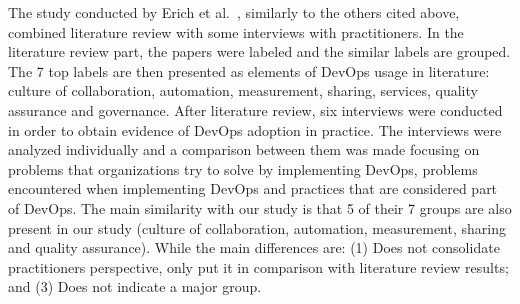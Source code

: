 The study conducted by Erich et al.~\cite{qualitative_devops_journalsw_17},
similarly to the others cited above, combined literature review with some
interviews with practitioners. In the literature review part, the papers were
labeled and the similar labels are grouped. The 7 top labels are then presented
as elements of DevOps usage in literature: culture of collaboration, automation,
measurement, sharing, services, quality assurance and governance. After literature
review, six interviews were conducted in order to obtain evidence of DevOps
adoption in practice. The interviews were analyzed individually and a comparison
between them was made focusing on problems that organizations try to solve by
implementing DevOps, problems encountered when implementing DevOps and practices
that are considered part of DevOps. The main similarity with our study
is that 5 of their 7 groups are also present in our study (culture of collaboration,
automation, measurement, sharing and quality assurance). While the main
differences are: (1) Does not consolidate practitioners perspective, only put it
in comparison with literature review results; and (3) Does not indicate a major group.
